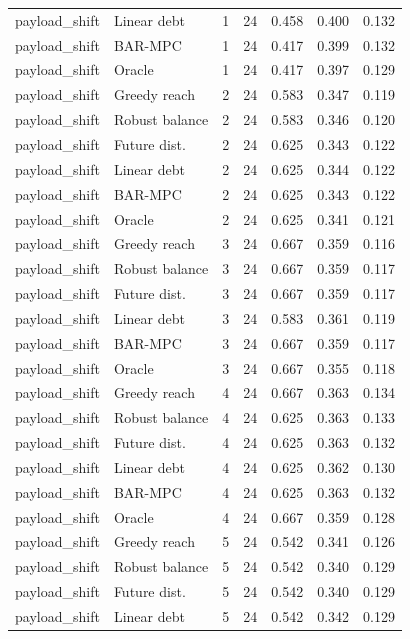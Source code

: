 \begin{longtable}{llrrrrr}
payload\_shift & Linear debt & 1 & 24 & 0.458 & 0.400 & 0.132 \\
payload\_shift & BAR-MPC & 1 & 24 & 0.417 & 0.399 & 0.132 \\
payload\_shift & Oracle & 1 & 24 & 0.417 & 0.397 & 0.129 \\
payload\_shift & Greedy reach & 2 & 24 & 0.583 & 0.347 & 0.119 \\
payload\_shift & Robust balance & 2 & 24 & 0.583 & 0.346 & 0.120 \\
payload\_shift & Future dist. & 2 & 24 & 0.625 & 0.343 & 0.122 \\
payload\_shift & Linear debt & 2 & 24 & 0.625 & 0.344 & 0.122 \\
payload\_shift & BAR-MPC & 2 & 24 & 0.625 & 0.343 & 0.122 \\
payload\_shift & Oracle & 2 & 24 & 0.625 & 0.341 & 0.121 \\
payload\_shift & Greedy reach & 3 & 24 & 0.667 & 0.359 & 0.116 \\
payload\_shift & Robust balance & 3 & 24 & 0.667 & 0.359 & 0.117 \\
payload\_shift & Future dist. & 3 & 24 & 0.667 & 0.359 & 0.117 \\
payload\_shift & Linear debt & 3 & 24 & 0.583 & 0.361 & 0.119 \\
payload\_shift & BAR-MPC & 3 & 24 & 0.667 & 0.359 & 0.117 \\
payload\_shift & Oracle & 3 & 24 & 0.667 & 0.355 & 0.118 \\
payload\_shift & Greedy reach & 4 & 24 & 0.667 & 0.363 & 0.134 \\
payload\_shift & Robust balance & 4 & 24 & 0.625 & 0.363 & 0.133 \\
payload\_shift & Future dist. & 4 & 24 & 0.625 & 0.363 & 0.132 \\
payload\_shift & Linear debt & 4 & 24 & 0.625 & 0.362 & 0.130 \\
payload\_shift & BAR-MPC & 4 & 24 & 0.625 & 0.363 & 0.132 \\
payload\_shift & Oracle & 4 & 24 & 0.667 & 0.359 & 0.128 \\
payload\_shift & Greedy reach & 5 & 24 & 0.542 & 0.341 & 0.126 \\
payload\_shift & Robust balance & 5 & 24 & 0.542 & 0.340 & 0.129 \\
payload\_shift & Future dist. & 5 & 24 & 0.542 & 0.340 & 0.129 \\
payload\_shift & Linear debt & 5 & 24 & 0.542 & 0.342 & 0.129 \\

\end{longtable}
